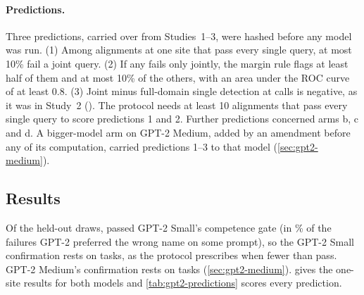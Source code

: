 \paragraph{Predictions.} Three predictions, carried over from Studies~1--3, were hashed before any model was run.
(1) Among alignments at one site that pass every single query, at most 10\% fail a joint query. (2) If any fails only
jointly, the margin rule flags at least half of them and at most 10\% of the others, with an area under the ROC curve
of at least 0.8. (3) Joint minus full-domain single detection at \Budget{} calls is negative, as it was in Study~2
(\TrnContrastOneTwenty). The protocol needs at least 10 alignments that pass every single query to score predictions 1
and 2. Further predictions concerned arms b, c and d. A bigger-model arm on GPT-2 Medium, added by an amendment before
any of its computation, carried predictions 1--3 to that model (\cref{sec:gpt2-medium}).

\subsection{Results}\label{sec:gpt2-results}

Of the \GateDrawnSmall{} held-out draws, \GatePassedSmall{} passed GPT-2 Small's competence gate (in
\GateWrongNamePctSmall\% of the failures GPT-2 preferred the wrong name on some prompt), so the GPT-2 Small
confirmation rests on \GatePassedSmall{} tasks, as the protocol prescribes when fewer than \NTasksConf{} pass. GPT-2
Medium's confirmation rests on \GatePassedMedium{} tasks (\cref{sec:gpt2-medium}).  gives the
one-site results for both models and \cref{tab:gpt2-predictions} scores every prediction.


